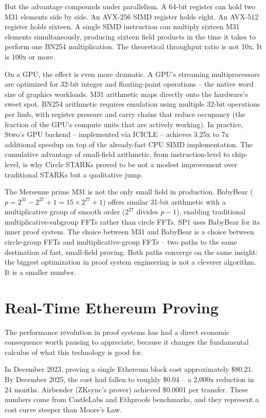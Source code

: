 \documentclass[
  11pt,
  openany]{report}
\begin{document}
But the advantage compounds under parallelism. A 64-bit register can hold two
M31 elements side by side. An AVX-256 SIMD register holds eight. An AVX-512
register holds sixteen. A single SIMD instruction can multiply sixteen M31
elements simultaneously, producing sixteen field products in the time it takes
to perform one BN254 multiplication. The theoretical throughput ratio is not
10x. It is 100x or more.

On a GPU, the effect is even more dramatic. A GPU's streaming multiprocessors
are optimized for 32-bit integer and floating-point operations -- the native
word size of graphics workloads. M31 arithmetic maps directly onto the
hardware's sweet spot. BN254 arithmetic requires emulation using multiple 32-bit
operations per limb, with register pressure and carry chains that reduce
occupancy (the fraction of the GPU's compute units that are actively working).
In practice, Stwo's GPU backend -- implemented via ICICLE -- achieves 3.25x to
7x additional speedup on top of the already-fast CPU SIMD implementation. The
cumulative advantage of small-field arithmetic, from instruction-level to
chip-level, is why Circle STARKs proved to be not a modest improvement over
traditional STARKs but a qualitative jump.

The Mersenne prime M31 is not the only small field in production. BabyBear
(\(p = 2^{31} - 2^{27} + 1 = 15 \times 2^{27} + 1\)) offers similar 31-bit
arithmetic with a multiplicative group of smooth order (\(2^{27}\) divides
\(p - 1\)), enabling traditional multiplicative-subgroup FFTs rather than circle
FFTs. SP1 uses BabyBear for its inner proof system. The choice between M31 and
BabyBear is a choice between circle-group FFTs and multiplicative-group FFTs --
two paths to the same destination of fast, small-field proving. Both paths
converge on the same insight: the biggest optimization in proof system
engineering is not a cleverer algorithm. It is a smaller number.

\section{Real-Time Ethereum Proving}\label{real-time-ethereum-proving}

The performance revolution in proof systems has had a direct economic
consequence worth pausing to appreciate, because it changes the fundamental
calculus of what this technology is good for.

In December 2023, proving a single Ethereum block cost approximately \$80.21. By
December 2025, the cost had fallen to roughly \$0.04 -- a 2,000x reduction in 24
months. Airbender (ZKsync's prover) achieved \$0.0001 per transfer. These
numbers come from CastleLabs and Ethproofs benchmarks, and they represent a cost
curve steeper than Moore's Law.
\end{document}
